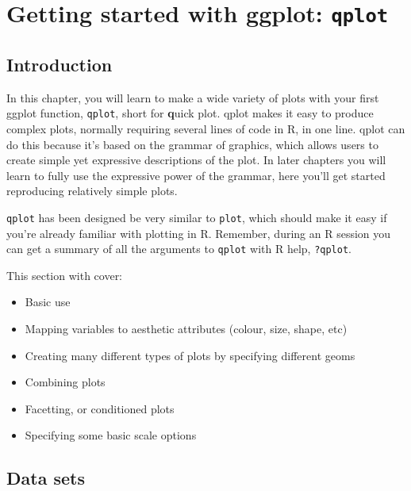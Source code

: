 



\chapter{Getting started with ggplot: {\tt qplot}}

\section{Introduction} 

In this chapter, you will learn to make a wide variety of plots with your first ggplot function, {\tt qplot}, short for {\bf q}uick plot. qplot makes it easy to produce complex plots, normally requiring several lines of code in R, in one line. qplot can do this because it's based on the grammar of graphics, which allows users to create simple yet expressive descriptions of the plot.  In later chapters you will learn to fully use the expressive power of the grammar, here you'll get started reproducing relatively simple plots.

{\tt qplot} has been designed be very similar to {\tt plot}, which should make it easy if you're already familiar with plotting in R.  Remember, during an R session you can get a summary of all the arguments to {\tt qplot} with R help, {\tt ?qplot}.

This section with cover: 

\begin{itemize}
	\item Basic use
	\item Mapping variables to aesthetic attributes (colour, size, shape, etc)
	\item Creating many different types of plots by specifying different geoms
	\item Combining plots 
	\item Facetting, or conditioned plots
	\item Specifying some basic scale options
\end{itemize}

\section{Data sets}\label{sec:data_sets}

